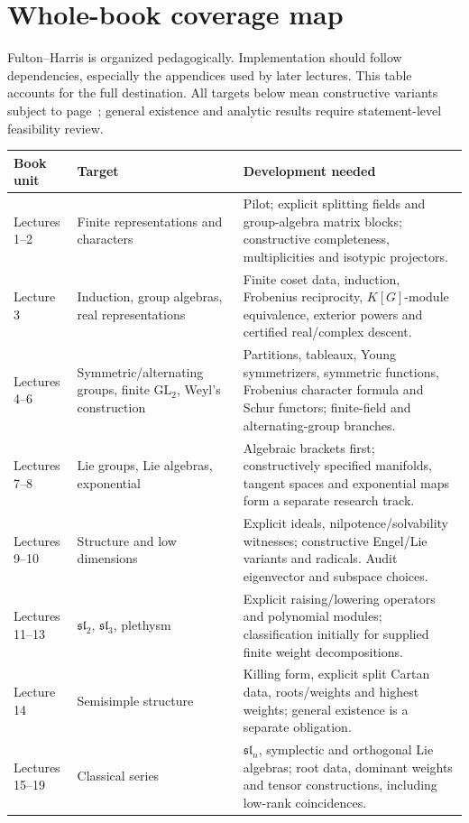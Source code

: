 \documentclass[11pt,a4paper]{article}
\newcommand{\slie}{\mathfrak{sl}}
\begin{document}
\newpage
\section{Whole-book coverage map}\label{sec:coverage}
Fulton--Harris is organized pedagogically. Implementation should follow
dependencies, especially the appendices used by later lectures. This table
accounts for the full destination. All targets below mean constructive
variants subject to page~\pageref{sec:replacements}; general existence and
analytic results require statement-level feasibility review.

{\small
\begin{tabularx}{\linewidth}{@{}P{27mm}P{43mm}Y@{}}
\toprule
Book unit & Target & Development needed \\
\midrule
Lectures 1--2 & Finite representations and characters & Pilot; explicit splitting fields and group-algebra matrix blocks; constructive completeness, multiplicities and isotypic projectors. \\
Lecture 3 & Induction, group algebras, real representations & Finite coset data, induction, Frobenius reciprocity, $K[G]$-module equivalence, exterior powers and certified real/complex descent. \\
Lectures 4--6 & Symmetric/alternating groups, finite $\mathrm{GL}_2$, Weyl's construction & Partitions, tableaux, Young symmetrizers, symmetric functions, Frobenius character formula and Schur functors; finite-field and alternating-group branches. \\
Lectures 7--8 & Lie groups, Lie algebras, exponential & Algebraic brackets first; constructively specified manifolds, tangent spaces and exponential maps form a separate research track. \\
Lectures 9--10 & Structure and low dimensions & Explicit ideals, nilpotence/solvability witnesses; constructive Engel/Lie variants and radicals. Audit eigenvector and subspace choices. \\
Lectures 11--13 & $\slie_2$, $\slie_3$, plethysm & Explicit raising/lowering operators and polynomial modules; classification initially for supplied finite weight decompositions. \\
Lecture 14 & Semisimple structure & Killing form, explicit split Cartan data, roots/weights and highest weights; general existence is a separate obligation. \\
Lectures 15--19 & Classical series & $\slie_n$, symplectic and orthogonal Lie algebras; root data, dominant weights and tensor constructions, including low-rank coincidences. \\

\end{tabularx}}
\end{document}
